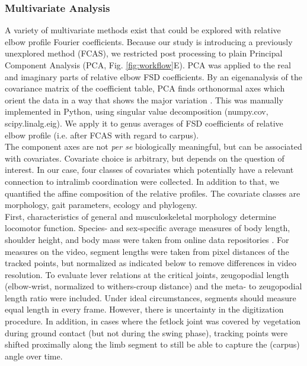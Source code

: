 \documentclass[10pt, a4paper]{article}
\begin{document}
\begin{linenumbers}[1]
\subsubsection*{Multivariate Analysis}
A variety of multivariate methods exist that could be explored with relative elbow profile Fourier coefficients. 
Because our study is introducing a previously unexplored method (FCAS), we restricted post processing to plain Principal Component Analysis (PCA, Fig. \ref{fig:workflow}E). 
PCA was applied to the real and imaginary parts of relative elbow FSD coefficients. 
By an eigenanalysis of the covariance matrix of the coefficient table, PCA finds orthonormal axes which orient the data in a way that shows the major variation \citep[\textit{cf.}][]{MacLeod2007}. 
This was manually implemented in Python, using singular value decomposition (\textsf{numpy.cov}, \textsf{scipy.linalg.eig}). 
We apply it to genus averages \citep{Mitteroecker2011} of FSD coefficients of relative elbow profile (i.e. after FCAS with regard to carpus). 
\\The component axes are not \textit{per se} biologically meaningful, but can be associated with covariates. 
Covariate choice is arbitrary, but depends on the question of interest. 
In our case, four classes of covariates which potentially have a relevant connection to intralimb coordination were collected. 
In addition to that, we quantified the affine composition of the relative profiles. 
The covariate classes are morphology, gait parameters, ecology and phylogeny. 
\\First, characteristics of general and musculoskeletal morphology determine locomotor function. 
Species- and sex-specific average measures of body length, shoulder height, and body mass were taken from online data repositories \citep{UltimateUngulate,AnimalDiversityWeb}. 
For measures on the video, segment lengths were taken from pixel distances of the tracked points, but normalized as indicated below to remove differences in video resolution. 
To evaluate lever relations at the critical joints, zeugopodial length (elbow-wrist, normalized to withers-croup distance) and the meta- to zeugopodial length ratio were included. 
Under ideal circumstances, segments should measure equal length in every frame. 
However, there is uncertainty in the digitization procedure. 
In addition, in cases where the fetlock joint was covered by vegetation during ground contact (but not during the swing phase), tracking points were shifted proximally along the limb segment to still be able to capture the (carpus) angle over time. 

\end{linenumbers}
\end{document}
